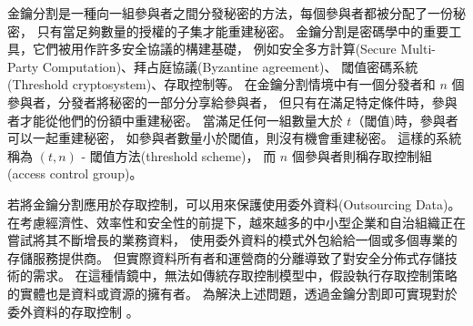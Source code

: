     金鑰分割是一種向一組參與者之間分發秘密的方法，每個參與者都被分配了一份秘密，
只有當足夠數量的授權的子集才能重建秘密。
金鑰分割是密碼學中的重要工具，它們被用作許多安全協議的構建基礎，
例如安全多方計算(Secure Multi-Party Computation)、拜占庭協議(Byzantine agreement)、
閾值密碼系統(Threshold cryptosystem)、存取控制等\cite{beimel2011secret}。
在金鑰分割情境中有一個分發者和 $n$ 個參與者，分發者將秘密的一部分分享給參與者，
但只有在滿足特定條件時，參與者才能從他們的份額中重建秘密。
當滿足任何一組數量大於 $t$（閾值)時，參與者可以一起重建秘密，
如參與者數量小於閾值，則沒有機會重建秘密。
這樣的系統稱為 $(t , n )$ - 閾值方法(threshold scheme)，
而 $n$ 個參與者則稱存取控制組(access control group)\cite{chum2012proposed}。

    若將金鑰分割應用於存取控制，可以用來保護使用委外資料(Outsourcing Data)。
在考慮經濟性、效率性和安全性的前提下，越來越多的中小型企業和自治組織正在嘗試將其不斷增長的業務資料，
使用委外資料的模式外包給給一個或多個專業的存儲服務提供商。
但實際資料所有者和運營商的分離導致了對安全分佈式存儲技術的需求。
在這種情鏡中，無法如傳統存取控制模型中，假設執行存取控制策略的實體也是資料或資源的擁有者。
為解決上述問題，透過金鑰分割即可實現對於委外資料的存取控制
\cite{naor1998access}\cite{hadavi2016access}\cite{zhang2016privacy}。